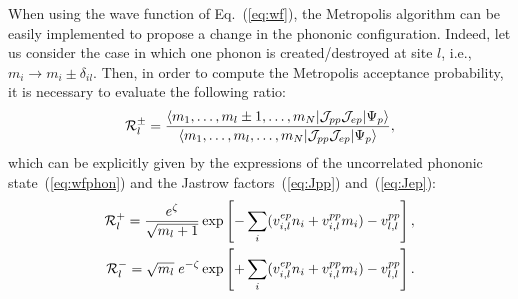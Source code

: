 \documentclass[aps,superscriptaddress,amsmath,amssymb,twocolumn,showpacs,floatfix,english]{revtex4}
\begin{document}
When using the wave function of Eq.~(\ref{eq:wf}), the Metropolis algorithm can be easily implemented to propose a change in the phononic 
configuration. Indeed, let us consider the case in which one phonon is created/destroyed at site $l$, i.e., $m_{i} \to m_{i} \pm \delta_{il}$.
Then, in order to compute the Metropolis acceptance probability, it is necessary to evaluate the following ratio:
\begin{equation}
{\cal R}^{\pm}_l = \frac{\langle m_1,\dots,m_l \pm 1,\dots,m_N|{\cal J}_{pp} {\cal J}_{ep}|\Psi_{p}\rangle}
{\langle m_1,\dots,m_l,\dots,m_N|{\cal J}_{pp} {\cal J}_{ep}|\Psi_{p}\rangle},
\end{equation}
which can be explicitly given by the expressions of the uncorrelated phononic state~(\ref{eq:wfphon}) and the Jastrow 
factors~(\ref{eq:Jpp}) and~(\ref{eq:Jep}):
\begin{eqnarray}
{\cal R}^{+}_l = \frac{e^{\zeta}}{\sqrt{m_l+1}} \exp \left [ -\sum_{i} ( v^{ep}_{i,l} n_{i}+v^{pp}_{i,l} m_{i} )-v^{pp}_{l,l} \right ], \\
{\cal R}^{-}_l = \sqrt{m_l} \; e^{-\zeta} \exp \left [ +\sum_{i} ( v^{ep}_{i,l} n_{i}+v^{pp}_{i,l} m_{i} )-v^{pp}_{l,l} \right ].
\end{eqnarray}
\end{document}
